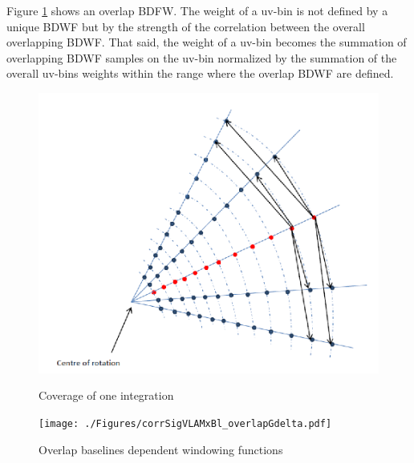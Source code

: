 \documentclass[useAMS,usenatbib]{mn2e}
\newtheorem{definition}[theorem]{Definition}
\begin{document}
Figure \ref{fig:corrSigVLAMxBl_overlapGdelta} shows an overlap BDFW. The weight of a uv-bin is not defined by a unique BDWF but by the 
strength of the correlation between the overall  overlapping BDWF. 
That said, the weight of a uv-bin becomes the summation of overlapping BDWF samples on the uv-bin normalized by the summation of the 
overall uv-bins weights within the range where the overlap BDWF are defined.
\begin{figure}
\begin{minipage}{0.38\linewidth}\includegraphics[width=1\textwidth]{./Figures/uvcov.png}\caption{Coverage of 
one integration}\label{fig:uvcov}\end{minipage}
  \hspace{1cm} 
\begin{minipage}{0.38\linewidth}\texttt{[image: ./Figures/corrSigVLAMxBl\_overlapGdelta.pdf]}\caption{Overlap 
baselines dependent windowing functions}\label{fig:corrSigVLAMxBl_overlapGdelta}\end{minipage}
\end{figure}
\end{document}
